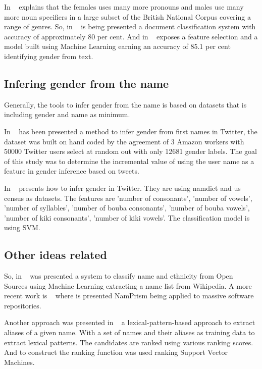 \documentclass[a4paper]{article}
\begin{document}
In ~\cite{argamon2003gender} explains that the females uses many more
pronouns and males use many more noun specifiers in a large subset of
the British National Corpus covering a range of genres. So, in
~\cite{koppel2002automatically} is being presented a document
classification system with accuracy of approximately 80 per cent. And
in ~\cite{cheng2011author} exposes a feature selection and a model
built using Machine Learning earning an accuracy of 85.1 per cent
identifying gender from text.

\subsection{Infering gender from the name}

Generally, the tools to infer gender from the name is based on
datasets that is including gender and name as minimum.

In ~\cite{liu2013s} has been presented a method to infer gender from
first names in Twitter, the dataset was built on hand coded by the
agreement of 3 Amazon workers with 50000 Twitter users select at
random out with only 12681 gender labels. The goal of this study was
to determine the incremental value of using the user name as a feature
in gender inference based on tweets.

In ~\cite{mueller2016gender} presents how to infer gender in
Twitter. They are using namdict and us census as datasets. The
features are 'number of consonants', 'number of vowels', 'number of
syllables', 'number of bouba consonants', 'number of bouba vowels',
'number of kiki consonants', 'number of kiki vowels'. The
classification model is using SVM.

\subsection{Other ideas related}

So, in ~\cite{ambekar2009name} was presented a system to classify name
and ethnicity from Open Sources using Machine Learning extracting a
name list from Wikipedia. A more recent work is
~\cite{nadri2021relationship} where is presented NamPrism being
applied to massive software repositories.

Another approach was presented in ~\cite{bollegala2010automatic} a
lexical-pattern-based approach to extract aliases of a given
name. With a set of names and their aliases as training data to
extract lexical patterns. The candidates are ranked using various
ranking scores. And to construct the ranking function was used
ranking Support Vector Machines.
\end{document}
